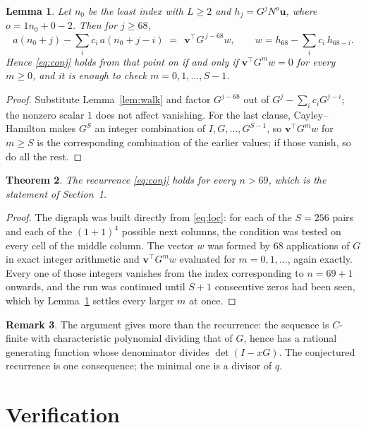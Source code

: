 \documentclass[11pt,a4paper]{article}
\theoremstyle{plain}
\newtheorem{theorem}{Theorem}
\newtheorem{lemma}[theorem]{Lemma}
\theoremstyle{definition}
\newtheorem{remark}[theorem]{Remark}
\begin{document}
\begin{lemma}\label{lem:crit}
Let $n_0$ be the least index with $L\ge2$ and $h_j=G^{j}N^{o}\mathbf{u}$, where
$o=1n_0+0-2$. Then for $j\ge68$,
\[
a(n_0+j)-\sum_i c_i\,a(n_0+j-i)\;=\;\,\mathbf{v}^{\!\top}G^{\,j-68}w,
\qquad w=h_{68}-\sum_i c_i\,h_{68-i} .
\]
Hence \eqref{eq:conj} holds from that point on if and only if
$\mathbf{v}^{\!\top}G^{m}w=0$ for every $m\ge0$, and it is enough to check
$m=0,1,\dots,S-1$.
\end{lemma}

\begin{proof}
Substitute Lemma~\ref{lem:walk} and factor $G^{j-68}$ out of
$G^{j}-\sum_ic_iG^{j-i}$; the nonzero scalar $1$ does not affect
vanishing. For the last clause, Cayley--Hamilton makes $G^{S}$ an integer combination of
$I,G,\dots,G^{S-1}$, so $\mathbf{v}^{\!\top}G^{m}w$ for $m\ge S$ is the corresponding
combination of the earlier values; if those vanish, so do all the rest.
\end{proof}

\begin{theorem}
The recurrence \eqref{eq:conj} holds for every $n>69$, which is the statement of
Section~1.
\end{theorem}

\begin{proof}
The digraph was built directly from \eqref{eq:loc}: for each of the $S=256$ pairs and each
of the $(1+1)^{4}$ possible next columns, the condition was tested on every cell of
the middle column. The vector $w$ was formed by $68$ applications of $G$ in exact integer
arithmetic and $\mathbf{v}^{\!\top}G^{m}w$ evaluated for $m=0,1,\dots$, again exactly.
Every one of those integers vanishes from the index corresponding to $n=69+1$ onwards,
and the run was continued until $S+1$ consecutive zeros had been seen, which by
Lemma~\ref{lem:crit} settles every larger $m$ at once.
\end{proof}

\begin{remark}
The argument gives more than the recurrence: the sequence is $C$-finite with characteristic
polynomial dividing that of $G$, hence has a rational generating function whose denominator
divides $\det(I-xG)$. The conjectured recurrence is one consequence; the minimal one is a
divisor of $q$.
\end{remark}

\section{Verification}
\end{document}
